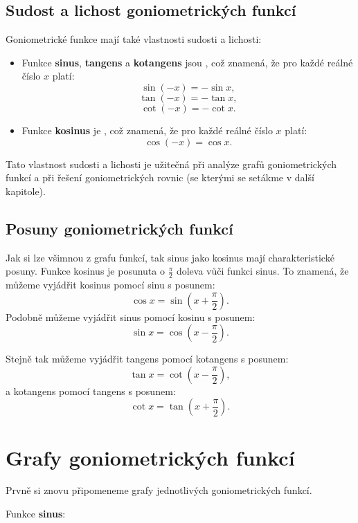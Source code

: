 \documentclass[12pt,a4paper]{article}
\begin{document}
\subsection{Sudost a lichost goniometrických funkcí}
Goniometrické funkce mají také vlastnosti sudosti a lichosti:
\begin{itemize}
    \item Funkce \textbf{sinus}, \textbf{tangens} a \textbf{kotangens} jsou , což znamená, že pro každé reálné číslo $x$ platí:
    \[\sin(-x) = -\sin x,\]
    \[\tan(-x) = -\tan x,\]
    \[\cot(-x) = -\cot x.\]
    \item Funkce \textbf{kosinus} je , což znamená, že pro každé reálné číslo $x$ platí:
    \[\cos(-x) = \cos x.\]
\end{itemize}

Tato vlastnost sudosti a lichosti je užitečná při analýze grafů goniometrických funkcí a při řešení goniometrických rovnic (se kterými se setákme v další kapitole).

\subsection{Posuny goniometrických funkcí}
Jak si lze všimnou z grafu funkcí, tak sinus jako kosinus mají charakteristické posuny.
Funkce kosinus je posunuta o $\frac{\pi}{2}$ doleva vůči funkci sinus.
To znamená, že můžeme vyjádřit kosinus pomocí sinu s posunem:
\[\cos x = \sin\left(x + \frac{\pi}{2}\right).\]
Podobně můžeme vyjádřit sinus pomocí kosinu s posunem:
\[\sin x = \cos\left(x - \frac{\pi}{2}\right).\]

Stejně tak můžeme vyjádřit tangens pomocí kotangens s posunem:
\[\tan x = \cot\left(x - \frac{\pi}{2}\right),\]
a kotangens pomocí tangens s posunem:
\[\cot x = \tan\left(x + \frac{\pi}{2}\right).\]


\newpage
\section{Grafy goniometrických funkcí}

Prvně si znovu připomeneme grafy jednotlivých goniometrických funkcí.

\smallskip
Funkce \textbf{sinus}:
\begin{center}
\end{center}
\end{document}

